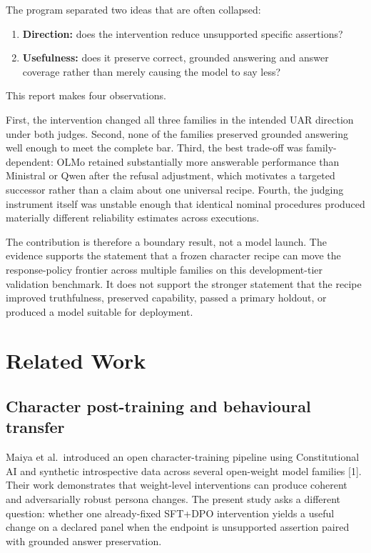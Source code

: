 \documentclass[9pt,letterpaper,twocolumn]{extarticle}
\providecommand{\tightlist}{\setlength{\itemsep}{0pt}\setlength{\parskip}{0pt}}
\begin{document}
The program separated two ideas that are often collapsed:

\begin{enumerate}
\def\labelenumi{\arabic{enumi}.}
\tightlist
\item
  \textbf{Direction:} does the intervention reduce unsupported specific
  assertions?
\item
  \textbf{Usefulness:} does it preserve correct, grounded answering and
  answer coverage rather than merely causing the model to say less?
\end{enumerate}

This report makes four observations.

First, the intervention changed all three families in the intended UAR
direction under both judges. Second, none of the families preserved
grounded answering well enough to meet the complete bar. Third, the best
trade-off was family-dependent: OLMo retained substantially more
answerable performance than Ministral or Qwen after the refusal
adjustment, which motivates a targeted successor rather than a claim
about one universal recipe. Fourth, the judging instrument itself was
unstable enough that identical nominal procedures produced materially
different reliability estimates across executions.

The contribution is therefore a boundary result, not a model launch. The
evidence supports the statement that a frozen character recipe can move
the response-policy frontier across multiple families on this
development-tier validation benchmark. It does not support the stronger
statement that the recipe improved truthfulness, preserved capability,
passed a primary holdout, or produced a model suitable for deployment.

\section{Related Work}\label{related-work}

\subsection{Character post-training and behavioural
transfer}\label{character-post-training-and-behavioural-transfer}

Maiya et al.~introduced an open character-training pipeline using
Constitutional AI and synthetic introspective data across several
open-weight model families {[}1{]}. Their work demonstrates that
weight-level interventions can produce coherent and adversarially robust
persona changes. The present study asks a different question: whether
one already-fixed SFT+DPO intervention yields a useful change on a
declared panel when the endpoint is unsupported assertion paired with
grounded answer preservation.
\end{document}
